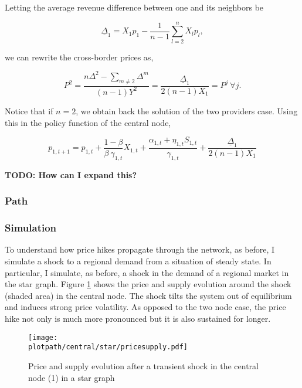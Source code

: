 Letting the average revenue difference between one and its neighbors be

\begin{equation*}
    \underline{\Delta}_1 = X_1 p_1 - \frac{1}{n-1} \sum^n_{l = 2} X_l p_l,
\end{equation*}

we can rewrite the cross-border prices as,

\begin{equation*}
    P^2 = \frac{n \Delta^2 - \sum_{m \neq 2} \Delta^m}{(n-1) Y^2} = \frac{\underline{\Delta}_1}{2 (n-1) X_1} = P^j \ \forall j.
\end{equation*}

Notice that if $n = 2$, we obtain back the solution of the two providers case. Using this in the policy function of the central node,


\begin{equation*}
    p_{1, t+1} = p_{1, t} + \frac{1-\beta}{\beta \ \gamma_{1, t}} X_{1, t} + \frac{\alpha_{1, t} + \eta_{1, t} S_{1, t}}{\gamma_{1, t}} + \frac{\underline{\Delta}_1}{2 (n-1) X_1}
\end{equation*}

\textbf{TODO: How can I expand this?}

\subsubsection{Path}


\subsubsection{Simulation}

To understand how price hikes propagate through the network, as before, I simulate a shock to a regional demand from a situation of steady state. In particular, I simulate, as before, a shock in the demand of a regional market in the star graph. Figure \ref{fig:transshockcen_star} shows the price and supply evolution around the shock (shaded area) in the central node. The shock tilts the system out of equilibrium and induces strong price volatility. As opposed to the two node case, the price hike not only is much more pronounced but it is also sustained for longer.

\begin{figure}[H]
    \centering
    \texttt{[image: \\plotpath/central/star/pricesupply.pdf]}
    \caption{Price and supply evolution after a transient shock in the central node (1) in a star graph} \label{fig:transshockcen_star}
\end{figure}

